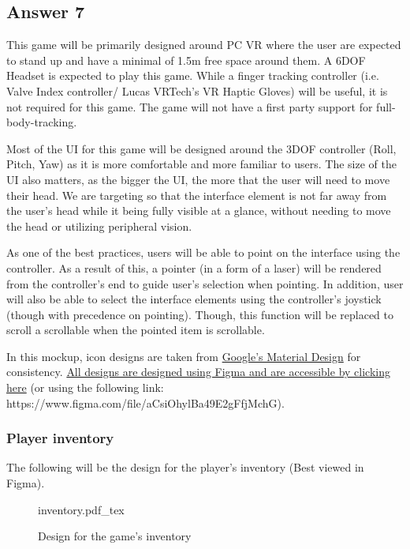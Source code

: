 \documentclass[
  11pt, %
]{assignment}
\begin{document}
\subsection*{Answer 7}
This game will be primarily designed around PC VR where the user are expected to stand up and have a minimal of 1.5m free space around them. A 6DOF Headset is expected to play this game. While a finger tracking controller (i.e. Valve Index controller/ Lucas VRTech's VR Haptic Gloves) will be useful, it is not required for this game. The game will not have a first party support for full-body-tracking.

Most of the UI for this game will be designed around the 3DOF controller (Roll, Pitch, Yaw) as it is more comfortable and more familiar to users. The size of the UI also matters, as the bigger the UI, the more that the user will need to move their head. We are targeting so that the interface element is not far away from the user's head while it being fully visible at a glance, without needing to move the head or utilizing peripheral vision.

As one of the best practices, users will be able to point on the interface using the controller. As a result of this, a pointer (in a form of a laser) will be rendered from the controller's end to guide user's selection when pointing. In addition, user will also be able to select the interface elements using the controller's joystick (though with precedence on pointing). Though, this function will be replaced to scroll a scrollable when the pointed item is scrollable.

In this mockup, icon designs are taken from \href{https://material.google.com}{Google's Material Design} for consistency. \href{https://www.figma.com/file/aCsiOhylBa49E2gFfjMchG}{All designs are designed using Figma and are accessible by clicking here} (or using the following link: https://www.figma.com/file/aCsiOhylBa49E2gFfjMchG).

\subsubsection*{Player inventory}

The following will be the design for the player's inventory (Best viewed in Figma).

\begin{figure}[ht]
  \centering
  \def\svgwidth{0.55\linewidth}
  {inventory.pdf_tex}
  \caption{Design for the game's inventory}
\end{figure}
\end{document}

